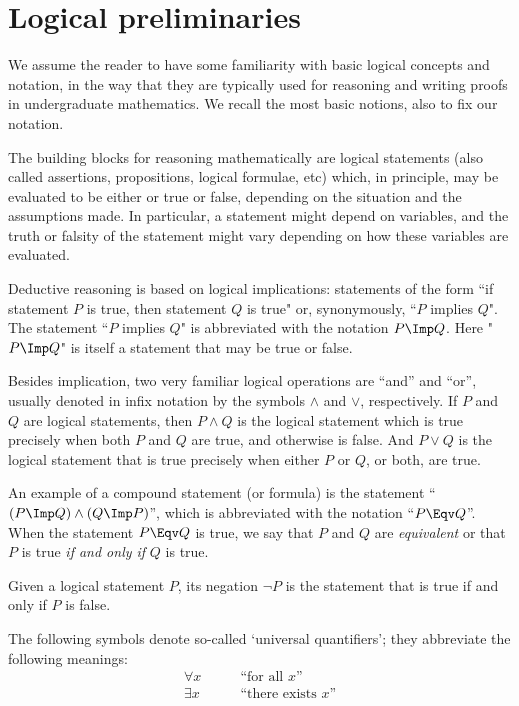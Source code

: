 

\section{Logical preliminaries}

We assume the reader to have some familiarity with basic logical concepts and notation, in the way that they are typically used for reasoning and writing proofs in undergraduate mathematics. We recall the most basic notions, also to fix our notation. 

The building blocks for reasoning mathematically are logical statements (also called assertions, propositions, logical formulae, etc) which, in principle, may be evaluated to be either or true or false, depending on the situation and the assumptions made.  In particular, a statement might depend on variables, and the truth or falsity of the statement might vary depending on how these variables are evaluated. 

Deductive reasoning is based on logical implications: statements of the form ``if statement $P$ is true, then statement $Q$ is true" or, synonymously, ``$P$ implies $Q$". The statement ``$P$ implies $Q$" is abbreviated with the notation $P \Imp Q$. Here "$P \Imp Q$" is itself a statement that may be true or false. 

Besides implication, two very familiar logical operations are ``and'' and ``or'', usually denoted in infix notation by the symbols $\wedge$ and $\vee$, respectively. If $P$ and $Q$ are logical statements, then $P \wedge Q$ is the logical statement which is true precisely when both $P$ and $Q$ are true, and otherwise is false. And $P \vee Q$ is the logical statement that is true precisely when either $P$ or $Q$, or both, are true. 

An example of a compound statement (or formula) is the statement ``$(P \Imp Q) \wedge (Q \Imp P)$'', which is abbreviated with the notation ``$P \Eqv Q$''. When the statement $P \Eqv Q$ is true, we say that $P$ and $Q$ are \emph{equivalent} or that $P$ is true \emph{if and only if} $Q$ is true. 


Given a logical statement $P$, its negation $\lnot P$ is the statement that is true if and only if $P$ is false. 

The following symbols denote so-called `universal quantifiers'; they abbreviate the following meanings:
\begin{align}
\forall x &\quad \quad \text{``for all $x$''} \\
\exists x &\quad \quad \text{``there exists $x$''}
\end{align}

